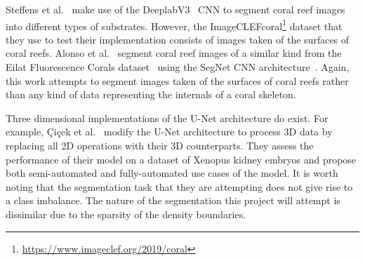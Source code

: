 Steffens et al.~\cite{steff} make use of the DeeplabV3~\cite{deeplab} CNN to segment coral reef images into different types of substrates. However, the ImageCLEFcoral\footnote{\url{https://www.imageclef.org/2019/coral}} dataset that they use to test their implementation consists of images taken of the surfaces of coral reefs. Alonso et al.~\cite{alonso} segment coral reef images of a similar kind from the Eilat Fluorescence Corals dataset~\cite{eilat} using the SegNet CNN architecture~\cite{segnet}. Again, this work attempts to segment images taken of the surfaces of coral reefs rather than any kind of data representing the internals of a coral skeleton.

Three dimensional implementations of the U-Net architecture do exist. For example, {\c{C}}i{\c{c}}ek et al.~\cite{cicek} modify the U-Net architecture to process 3D data by replacing all 2D operations with their 3D counterparts. They assess the performance of their model on a dataset of Xenopus kidney embryos and propose both semi-automated and fully-automated use cases of the model. It is worth noting that the segmentation task that they are attempting does not give rise to a class imbalance. The nature of the segmentation this project will attempt is dissimilar due to the sparsity of the density boundaries.



 

